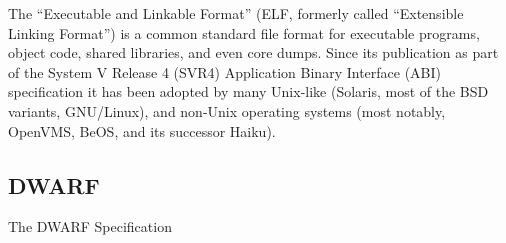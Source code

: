 The “Executable and Linkable Format” (ELF, formerly called “Extensible Linking
Format”) is a common standard file format for executable programs, object
code, shared libraries, and even core dumps. Since its publication as part of
the System V Release 4 (SVR4) Application Binary Interface (ABI) specification
\cite[c.~4]{elfspec-sysv}
it has been adopted by many Unix-like (Solaris, most of the BSD variants,
GNU/Linux), and non-Unix operating systems (most notably, OpenVMS, BeOS, and
its successor Haiku).

\subsection{DWARF}

The DWARF Specification \cite{dwarfspecv4}


